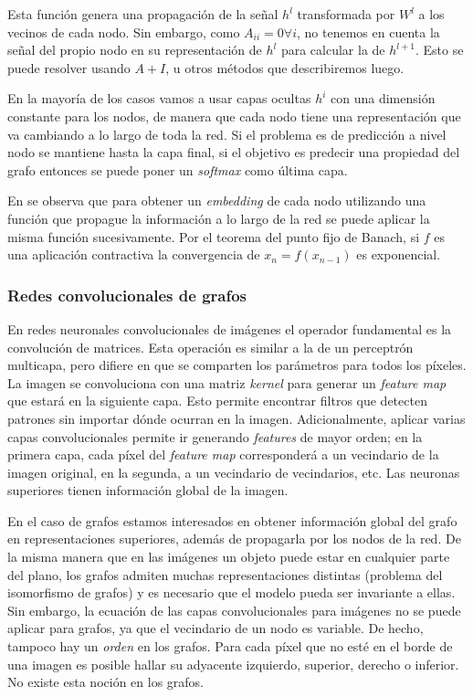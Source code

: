 \documentclass[
    left=2.0cm,         %
    right=2.0cm,        %
    top=2.0cm,          %
    bottom=2.5cm,         %
    bindingoffset=6mm,  %
    nohyphenation=false %
]{eiti/eiti-thesis}
\begin{document}
Esta función genera una propagación de la señal $h^l$ transformada por $W^l$ a
los vecinos de cada nodo. Sin embargo, como $A_{ii} = 0 \forall i$, no tenemos
en cuenta la señal del propio nodo en su representación de $h^l$ para calcular
la de $h^{l+1}$. Esto se puede resolver usando $A+I$, u otros métodos que describiremos
luego.

En la mayoría de los casos vamos a usar capas ocultas $h^i$ con una dimensión constante
para los nodos, de manera que cada nodo tiene una representación que va cambiando a lo
largo de toda la red. Si el problema es de predicción a nivel nodo se mantiene hasta la
capa final, si el objetivo es predecir una propiedad del grafo entonces se puede poner un
\textit{softmax} como última capa. 

En \cite{zhou2018graphreview} se observa que para obtener un \textit{embedding} de cada
nodo utilizando una función que propague la información a lo largo de la red se puede
aplicar la misma función sucesivamente. Por el teorema del punto fijo de Banach, si
$f$ es una aplicación contractiva la convergencia de $x_n = f(x_{n-1})$ es exponencial.


\subsubsection{Redes convolucionales de grafos}

En redes neuronales convolucionales de imágenes el operador fundamental es la convolución de
matrices. Esta operación es similar a la de un perceptrón multicapa, pero difiere en que 
se comparten los parámetros para todos los píxeles. La imagen se convoluciona con una
matriz \textit{kernel} para generar un \textit{feature map} que estará en la siguiente capa.
Esto permite encontrar filtros que detecten patrones sin importar dónde ocurran en la imagen.
Adicionalmente, aplicar varias capas convolucionales permite ir generando \textit{features}
de mayor orden; en la primera capa, cada píxel del \textit{feature map} corresponderá a un
vecindario de la imagen original, en la segunda, a un vecindario de vecindarios, etc. \cite{lecun1998gradient}
Las neuronas superiores tienen información global de la imagen.

En el caso de grafos estamos interesados en obtener información global del grafo en
representaciones superiores, además de propagarla por los nodos de la red. De la misma manera
que en las imágenes un objeto puede estar en cualquier parte del plano, los grafos admiten
muchas representaciones distintas (problema del isomorfismo de grafos) y es necesario que el
modelo pueda ser invariante a ellas. Sin embargo, la ecuación de las capas convolucionales
para imágenes no se puede aplicar para grafos, ya que el vecindario de un nodo es variable.
De hecho, tampoco hay un \textit{orden} en los grafos. Para cada píxel que no esté en el borde
de una imagen es posible hallar su adyacente izquierdo, superior, derecho o inferior. No
existe esta noción en los grafos.
\end{document}
